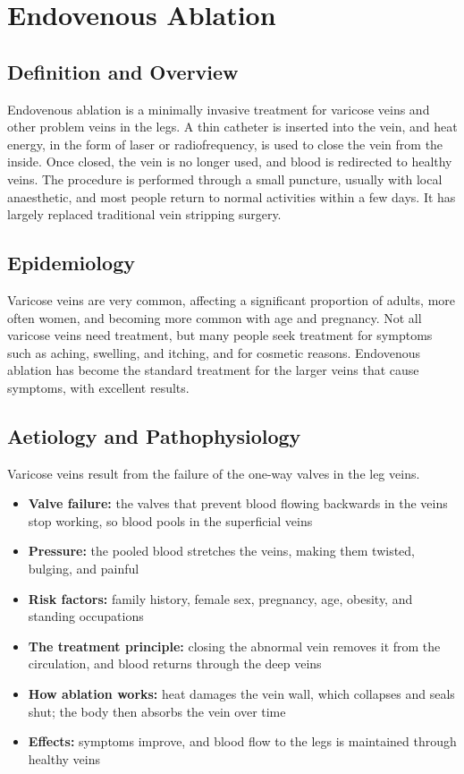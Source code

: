 \chapter{Endovenous Ablation}

\section*{Definition and Overview}
Endovenous ablation is a minimally invasive treatment for varicose veins and other problem veins in the legs. A thin catheter is inserted into the vein, and heat energy, in the form of laser or radiofrequency, is used to close the vein from the inside. Once closed, the vein is no longer used, and blood is redirected to healthy veins. The procedure is performed through a small puncture, usually with local anaesthetic, and most people return to normal activities within a few days. It has largely replaced traditional vein stripping surgery.

\section*{Epidemiology}
Varicose veins are very common, affecting a significant proportion of adults, more often women, and becoming more common with age and pregnancy. Not all varicose veins need treatment, but many people seek treatment for symptoms such as aching, swelling, and itching, and for cosmetic reasons. Endovenous ablation has become the standard treatment for the larger veins that cause symptoms, with excellent results.

\section*{Aetiology and Pathophysiology}
Varicose veins result from the failure of the one-way valves in the leg veins.
\begin{itemize}
    \item \textbf{Valve failure:} the valves that prevent blood flowing backwards in the veins stop working, so blood pools in the superficial veins
    \item \textbf{Pressure:} the pooled blood stretches the veins, making them twisted, bulging, and painful
    \item \textbf{Risk factors:} family history, female sex, pregnancy, age, obesity, and standing occupations
    \item \textbf{The treatment principle:} closing the abnormal vein removes it from the circulation, and blood returns through the deep veins
    \item \textbf{How ablation works:} heat damages the vein wall, which collapses and seals shut; the body then absorbs the vein over time
    \item \textbf{Effects:} symptoms improve, and blood flow to the legs is maintained through healthy veins
\end{itemize}

